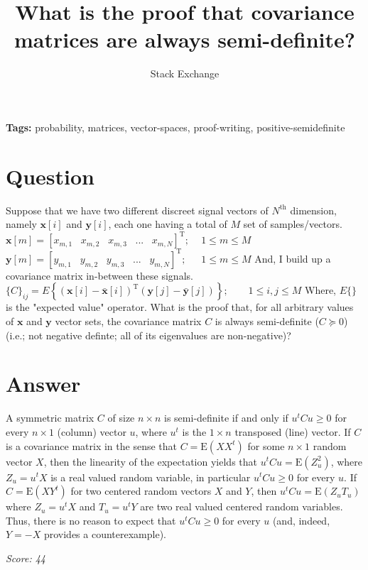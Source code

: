 \documentclass{article}
\title{What is the proof that covariance matrices are always semi-definite?}
\author{Stack Exchange}
\date{}
\begin{document}
\maketitle

\noindent\textbf{Tags:} probability, matrices, vector-spaces, proof-writing, positive-semidefinite

\section*{Question}
Suppose that we have two different discreet signal vectors of $N^\text{th}$ dimension, namely $\mathbf{x}[i]$ and $\mathbf{y}[i]$, each one having a total of $M$ set of samples/vectors. $\mathbf{x}[m] = [x_{m,1} \,\,\,\,\, x_{m,2} \,\,\,\,\, x_{m,3} \,\,\,\,\, ... \,\,\,\,\, x_{m,N}]^\text{T}; \,\,\,\,\,\,\, 1 \leq m \leq M$ $\mathbf{y}[m] = [y_{m,1} \,\,\,\,\, y_{m,2} \,\,\,\,\, y_{m,3} \,\,\,\,\, ... \,\,\,\,\, y_{m,N}]^\text{T}; \,\,\,\,\,\,\,\,\, 1 \leq m \leq M$ And, I build up a covariance matrix in-between these signals. $\{C\}_{ij} = E\left\{(\mathbf{x}[i] - \bar{\mathbf{x}}[i])^\text{T}(\mathbf{y}[j] - \bar{\mathbf{y}}[j])\right\}; \,\,\,\,\,\,\,\,\,\,\,\, 1 \leq i,j \leq M $ Where, $E\{\}$ is the "expected value" operator. What is the proof that, for all arbitrary values of $\mathbf{x}$ and $\mathbf{y}$ vector sets, the covariance matrix $C$ is always semi-definite ($C \succeq0$) (i.e.; not negative definte; all of its eigenvalues are non-negative)?

\section*{Answer}
A symmetric matrix $C$ of size $n\times n$ is semi-definite if and only if $u^tCu\geqslant0$ for every $n\times1$ (column) vector $u$, where $u^t$ is the $1\times n$ transposed (line) vector. If $C$ is a covariance matrix in the sense that $C=\mathrm E(XX^t)$ for some $n\times 1$ random vector $X$, then the linearity of the expectation yields that $u^tCu=\mathrm E(Z_u^2)$, where $Z_u=u^tX$ is a real valued random variable, in particular $u^tCu\geqslant0$ for every $u$. If $C=\mathrm E(XY^t)$ for two centered random vectors $X$ and $Y$, then $u^tCu=\mathrm E(Z_uT_u)$ where $Z_u=u^tX$ and $T_u=u^tY$ are two real valued centered random variables. Thus, there is no reason to expect that $u^tCu\geqslant0$ for every $u$ (and, indeed, $Y=-X$ provides a counterexample).

\vspace{1em}
\noindent\textit{Score: 44}
\end{document}
